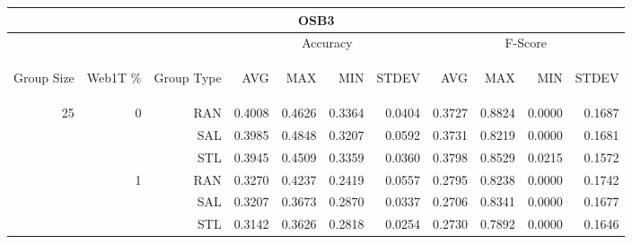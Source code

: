 \begin{center}
\begin{table}[htbp]
\begin{tabular}{ | r | r | r | r | r | r | r | r | r | r | r |}
\hline
\multicolumn{11}{|c|}{OSB3}\\
\hline
 & & & \multicolumn{4}{|c|}{Accuracy} & \multicolumn{4}{|c|}{F-Score}\\ \cline{4-11}
\begin{sideways}Group Size\end{sideways} & \begin{sideways}Web1T \%\end{sideways} & \begin{sideways}Group Type\end{sideways} & \begin{sideways}AVG\end{sideways} & \begin{sideways}MAX\end{sideways} & \begin{sideways}MIN\end{sideways} & \begin{sideways}STDEV\end{sideways} & \begin{sideways}AVG\end{sideways} & \begin{sideways}MAX\end{sideways} & \begin{sideways}MIN\end{sideways} & \begin{sideways}STDEV\end{sideways}\\
\hline
\multirow{18}{*}{25}
 & \multirow{3}{*}{0} & RAN & 0.4008 & 0.4626 & 0.3364 & 0.0404 & 0.3727 & 0.8824 & 0.0000 & 0.1687\\ \cline{3-11}
 &   & SAL & 0.3985 & 0.4848 & 0.3207 & 0.0592 & 0.3731 & 0.8219 & 0.0000 & 0.1681\\ \cline{3-11}
 &   & STL & 0.3945 & 0.4509 & 0.3359 & 0.0360 & 0.3798 & 0.8529 & 0.0215 & 0.1572\\ \cline{2-11}
 & \multirow{3}{*}{1} & RAN & 0.3270 & 0.4237 & 0.2419 & 0.0557 & 0.2795 & 0.8238 & 0.0000 & 0.1742\\ \cline{3-11}
 &   & SAL & 0.3207 & 0.3673 & 0.2870 & 0.0337 & 0.2706 & 0.8341 & 0.0000 & 0.1677\\ \cline{3-11}
 &   & STL & 0.3142 & 0.3626 & 0.2818 & 0.0254 & 0.2730 & 0.7892 & 0.0000 & 0.1646\\ \cline{2-11}

\end{tabular}
\end{table}
\end{center}
